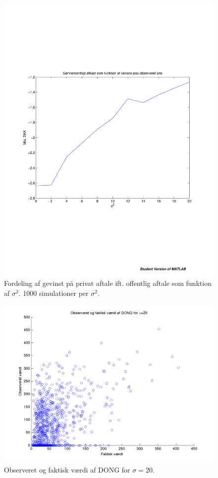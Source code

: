 \documentclass{article}
\begin{document}
 \begin{figure}
\includegraphics[scale=0.8]{../matlab/figs/return_variance}
\caption{Fordeling af gevinst p\aa{} privat aftale ift. offentlig aftale som funktion af $\sigma^2$. 1000 simulationer per $\sigma^2$. }
\label{fig:usikkerhed}
\end{figure}

\begin{figure}
\includegraphics[scale=0.8]{../matlab/figs/observed_actual_value}
\caption{Observeret og faktisk v\ae{}rdi af DONG for $\sigma=20$.}
\label{fig:observed_actual_value}
\end{figure}
\end{document}
